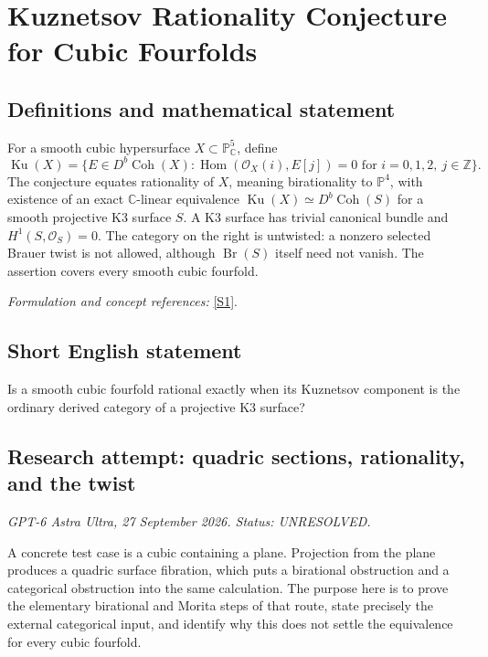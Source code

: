 \documentclass[11pt]{article}
\begin{document}
\section*{\texorpdfstring{Kuznetsov Rationality Conjecture for Cubic Fourfolds}{Kuznetsov Rationality Conjecture for Cubic Fourfolds}}\label{267}
\subsection{Definitions and mathematical statement}
For a smooth cubic hypersurface $X\subset{\mathbb{P}}^5_{{\mathbb{C}}}$, define
\[
 \operatorname{Ku}(X)=\{E\in D^b\operatorname{Coh}(X):
 \operatorname{Hom}(\mathcal O_X(i),E[j])=0\text{ for }i=0,1,2,\ j\in{\mathbb{Z}}\}.
\]
The conjecture equates rationality of $X$, meaning birationality to ${\mathbb{P}}^4$, with existence of an exact ${\mathbb{C}}$-linear equivalence
$\operatorname{Ku}(X)\simeq D^b\operatorname{Coh}(S)$ for a smooth projective K3 surface $S$. A K3 surface has trivial canonical bundle and $H^1(S,\mathcal O_S)=0$. The category on the right is untwisted: a nonzero selected Brauer twist is not allowed, although $\operatorname{Br}(S)$ itself need not vanish. The assertion covers every smooth cubic fourfold.
\par\smallskip\textit{Formulation and concept references:} \href{https://arxiv.org/pdf/0808.3351v1}{[S1]}.

\subsection{Short English statement}
Is a smooth cubic fourfold rational exactly when its Kuznetsov component is the ordinary derived category of a projective K3 surface?
\subsection{Research attempt: quadric sections, rationality, and the twist}
\textit{GPT-6 Astra Ultra, 27 September 2026. Status: UNRESOLVED.}

A concrete test case is a cubic containing a plane. Projection from the plane produces a quadric surface fibration, which puts a birational obstruction and a categorical obstruction into the same calculation. The purpose here is to prove the elementary birational and Morita steps of that route, state precisely the external categorical input, and identify why this does not settle the equivalence for every cubic fourfold.
\end{document}
